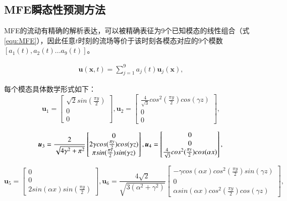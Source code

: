 \subsection{MFE瞬态性预测方法}
MFE的流动有精确的解析表达，可以被精确表征为9个已知模态的线性组合\cite{Moehlis2004ALM}（式\ref{equ:MFE}），因此任意$t$时刻的流场等价于该时刻各模态对应的9个模数$[a_1(t),a_2(t)...a_9(t)]$。

\begin{equation}\label{equ:MFE}
\begin{aligned}
\bm u(\bm x,t) = \sum_{j=1}^9a_j(t)\bm u_j(\bm x),
\end{aligned}
\end{equation}

每个模态具体数学形式如下：
$$
\bm u_1 =
\begin{bmatrix}
\sqrt{2}sin(\frac{\pi y}{2})\\
0\\
0
\end{bmatrix},
\bm u_2 =
\begin{bmatrix}
\frac{4}{\sqrt{3}}cos^2(\frac{\pi y}{2})cos(\gamma z)\\
0\\
0
\end{bmatrix},
$$

$$
\bm u_3 = \frac{2}{\sqrt{4\gamma^2+\pi^2}}
\begin{bmatrix}
0\\
2\gamma cos(\frac{\pi y}{2})cos(\gamma z)\\
\pi sin(\frac{\pi y}{2})sin(\gamma z)
\end{bmatrix},
\bm u_4 =
\begin{bmatrix}
0\\
0\\
\frac{4}{\sqrt{3}}cos^2(\frac{\pi y}{2})cos(\alpha x)
\end{bmatrix},\\
$$

$$
\bm u_5 =
\begin{bmatrix}
0\\
0\\
2sin(\alpha x)sin(\frac{\pi y}{2})
\end{bmatrix},
\bm u_6 = \frac{4\sqrt{2}}{\sqrt{3(\alpha^2+\gamma^2)}}
\begin{bmatrix}
-\gamma cos(\alpha x)cos^2(\frac{\pi y}{2})sin(\gamma z)\\
0\\
\alpha sin(\alpha x)cos^2(\frac{\pi y}{2})cos(\gamma z)
\end{bmatrix},
$$

